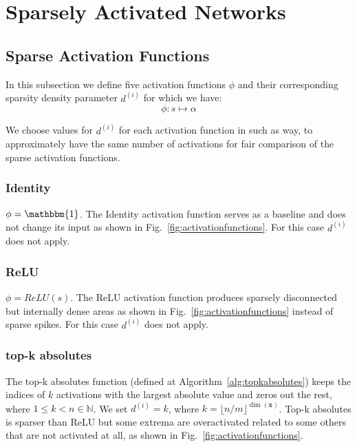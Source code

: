 \documentclass[journal]{IEEEtran}
\begin{document}
\section{Sparsely Activated Networks}
\label{sec:sans}

\subsection{Sparse Activation Functions}
\label{sec:safs}
In this subsection we define five activation functions $\phi$ and their corresponding sparsity density parameter $d^{(i)}$ for which we have:
\begin{equation}
	\label{eq:phi}
	\phi: s \longmapsto \alpha
\end{equation}

We choose values for $d^{(i)}$ for each activation function in such as way, to approximately have the same number of activations for fair comparison of the sparse activation functions.

\subsubsection{Identity}
\label{sec:identity}
$\phi = \mathbbm{1}$.
The Identity activation function serves as a baseline and does not change its input as shown in Fig.~\ref{fig:activationfunctions}.
For this case $d^{(i)}$ does not apply.

\subsubsection{ReLU}
\label{sec:relu}
$\phi = ReLU(s)$.
The ReLU activation function produces sparsely disconnected but internally dense areas as shown in Fig.~\ref{fig:activationfunctions} instead of sparse spikes.
For this case $d^{(i)}$ does not apply.

\subsubsection{top-k absolutes}
\label{sec:topkabsolutes}
The top-k absolutes function (defined at Algorithm~\ref{alg:topkabsolutes}) keeps the indices of $k$ activations with the largest absolute value and zeros out the rest, where $1 \le k < n \in \mathbb{N}$.
We set $d^{(i)} = k$, where $k = \lfloor n/m \rfloor^{\dim(\bm{x})}$.
Top-k absolutes is sparser than ReLU but some extrema are overactivated related to some others that are not activated at all, as shown in Fig.~\ref{fig:activationfunctions}.
\end{document}
